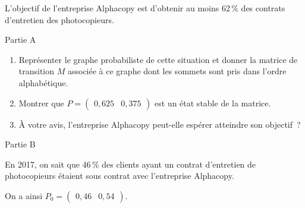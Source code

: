 L'objectif de l'entreprise Alphacopy est d'obtenir au moins 62\,\% des contrats d'entretien des photocopieurs.
\begin{center}\begin{h3}Partie A \end{h3}\end{center}
\begin{enumerate}
     \item Représenter le graphe probabiliste de cette situation et donner la matrice de transition $M$ associée à ce graphe dont les sommets sont pris dans l'ordre alphabétique.
     \item Montrer que $P = \begin{pmatrix} 0,625 & 0,375\end{pmatrix}$ est un état stable de la matrice.
     \item À votre avis, l'entreprise Alphacopy peut-elle espérer atteindre son objectif~?
\end{enumerate}
\begin{center}\begin{h3}Partie B \end{h3}\end{center}
En 2017, on sait que 46\,\% des clients ayant un contrat d'entretien de photocopieurs étaient sous contrat avec l'entreprise Alphacopy.
\par
On a ainsi $P_0=\begin{pmatrix} 0,46 & 0,54\end{pmatrix}$.

